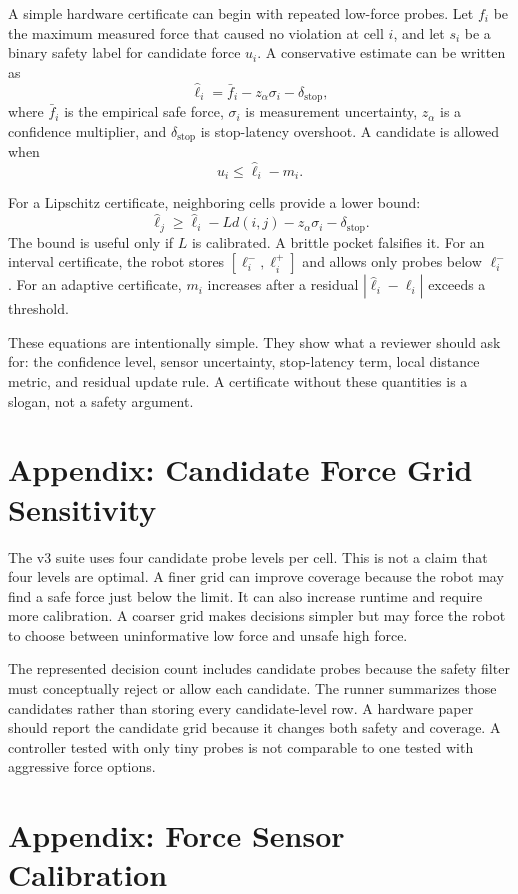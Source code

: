 \documentclass{article}
\begin{document}
A simple hardware certificate can begin with repeated low-force probes. Let
$f_i$ be the maximum measured force that caused no violation at cell $i$, and
let $s_i$ be a binary safety label for candidate force $u_i$. A conservative
estimate can be written as
\[
  \hat{\ell}_i = \bar{f}_i - z_\alpha \sigma_i - \delta_{\mathrm{stop}},
\]
where $\bar{f}_i$ is the empirical safe force, $\sigma_i$ is measurement
uncertainty, $z_\alpha$ is a confidence multiplier, and
$\delta_{\mathrm{stop}}$ is stop-latency overshoot. A candidate is allowed when
\[
  u_i \leq \hat{\ell}_i - m_i .
\]

For a Lipschitz certificate, neighboring cells provide a lower bound:
\[
  \hat{\ell}_j \geq \hat{\ell}_i - L d(i,j) - z_\alpha\sigma_i -
  \delta_{\mathrm{stop}}.
\]
The bound is useful only if $L$ is calibrated. A brittle pocket falsifies it.
For an interval certificate, the robot stores
$[\ell_i^-, \ell_i^+]$ and allows only probes below $\ell_i^-$. For an
adaptive certificate, $m_i$ increases after a residual
$|\hat{\ell}_i - \ell_i|$ exceeds a threshold.

These equations are intentionally simple. They show what a reviewer should ask
for: the confidence level, sensor uncertainty, stop-latency term, local
distance metric, and residual update rule. A certificate without these
quantities is a slogan, not a safety argument.

\section{Appendix: Candidate Force Grid Sensitivity}

The v3 suite uses four candidate probe levels per cell. This is not a claim
that four levels are optimal. A finer grid can improve coverage because the
robot may find a safe force just below the limit. It can also increase runtime
and require more calibration. A coarser grid makes decisions simpler but may
force the robot to choose between uninformative low force and unsafe high
force.

The represented decision count includes candidate probes because the safety
filter must conceptually reject or allow each candidate. The runner summarizes
those candidates rather than storing every candidate-level row. A hardware
paper should report the candidate grid because it changes both safety and
coverage. A controller tested with only tiny probes is not comparable to one
tested with aggressive force options.

\section{Appendix: Force Sensor Calibration}
\end{document}
